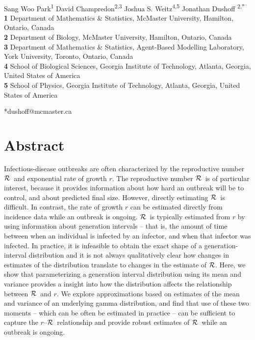 \documentclass[12pt]{article}
\newcommand{\rR}{\mbox{$r$--$\cal R$}}
\newcommand{\RR}{\ensuremath{{\cal R}}}
\begin{document}
\begin{flushleft}
{
\Large
\textbf{}
}
\newline
\\
Sang Woo Park\textsuperscript{1}
David Champredon\textsuperscript{2,3}
Joshua S. Weitz\textsuperscript{4,5}
Jonathan Dushoff\textsuperscript{ 2,*}
\\

\bigskip
\textbf{1} Department of Mathematics \& Statistics, McMaster University, Hamilton, Ontario, Canada
\\
\textbf{2} Department of Biology, McMaster University, Hamilton, Ontario, Canada
\\
\textbf{3} Department of Mathematics \& Statistics, Agent-Based Modelling Laboratory, York University, Toronto, Ontario, Canada
\\
\textbf{4} School of Biological Sciences, Georgia Institute of Technology, Atlanta, Georgia, United States of America
\\
\textbf{5} School of Physics, Georgia Institute of Technology, Atlanta, Georgia, United States of America
\\
\bigskip

*dushoff@mcmaster.ca
\end{flushleft}

\section*{Abstract}

Infectious-disease outbreaks are often characterized by the reproductive number \RR\ and exponential rate of growth $r$.
The reproductive number \RR\ is of particular interest, because it provides information about how hard an outbreak will be to control, and about predicted final size.
However, directly estimating \RR\ is difficult.
In contrast, the rate of growth $r$ can be estimated directly from incidence data while an outbreak is ongoing.
\RR\ is typically estimated from $r$ by using information about generation intervals -- that is, the amount of time between when an individual is infected by an infector, and when that infector was infected.
In practice, it is infeasible to obtain the exact shape of a generation-interval distribution and it is not always qualitatively clear how changes in estimates of the distribution translate to changes in the estimate of \RR.
Here, we show that parameterizing a generation interval distribution using its mean and variance provides a insight into how the distribution affects the relationship between \RR\ and $r$.
We explore approximations based on estimates of the mean and variance of an underlying gamma distribution, and find that use of these two moments -- which can be often be estimated in practice -- can be sufficient to capture the \rR\ relationship and provide robust estimates of \RR\ while an outbreak is ongoing.
\end{document}
